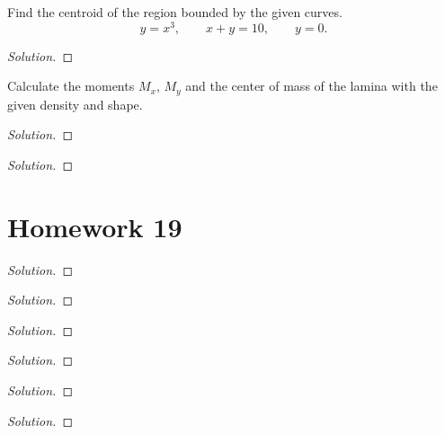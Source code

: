 \begin{problem}
Find the centroid of the region bounded by the given curves.
\[
y=x^3,\qquad
x+y=10,\qquad
y=0.
\]
\end{problem}
\begin{proof}[Solution]
\end{proof}

\begin{problem}
Calculate the moments $M_x$, $M_y$ and the center of mass of the lamina
with the given density and shape.
\end{problem}
\begin{proof}[Solution]
\end{proof}

\begin{problem}
\end{problem}
\begin{proof}[Solution]
\end{proof}


\section{Homework 19}
\begin{problem}
\end{problem}
\begin{proof}[Solution]
\end{proof}

\begin{problem}
\end{problem}
\begin{proof}[Solution]
\end{proof}

\begin{problem}
\end{problem}
\begin{proof}[Solution]
\end{proof}

\begin{problem}
\end{problem}
\begin{proof}[Solution]
\end{proof}

\begin{problem}
\end{problem}
\begin{proof}[Solution]
\end{proof}

\begin{problem}
\end{problem}
\begin{proof}[Solution]
\end{proof}

